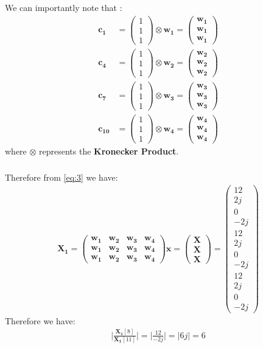 \documentclass{beamer}
\newcommand{\myvec}[1]{\ensuremath{\begin{pmatrix}#1\end{pmatrix}}}
\renewcommand{\vec}[1]{\mathbf{#1}}
\begin{document}
\begin{frame}
\frametitle{}
We can importantly note that :
\begin{align}
\vec{c_{1}} &= \myvec{1 \\ 1 \\ 1} \otimes \vec{w_{1}} = \myvec{\vec{w_{1}} \\ \vec{w_{1}} \\ \vec{w_{1}}}\\
\vec{c_{4}} &= \myvec{1 \\ 1 \\ 1} \otimes \vec{w_{2}} = \myvec{\vec{w_{2}} \\ \vec{w_{2}} \\ \vec{w_{2}}}\\
\vec{c_{7}} &= \myvec{1 \\ 1 \\ 1} \otimes \vec{w_{3}} = \myvec{\vec{w_{3}} \\ \vec{w_{3}} \\ \vec{w_{3}}}\\
\vec{c_{10}} &= \myvec{1 \\ 1 \\ 1} \otimes \vec{w_{4}} = \myvec{\vec{w_{4}} \\ \vec{w_{4}} \\ \vec{w_{4}}}
\end{align}
where $\otimes$ represents the \textbf{Kronecker Product}.
\end{frame}

\begin{frame}
\frametitle{}
Therefore from \eqref{eq:3} we have:
\begin{align}
\vec{X_{1}} = \myvec{\vec{w_{1}} & \vec{w_{2}} & \vec{w_{3}} & \vec{w_{4}} \\ \vec{w_{1}} & \vec{w_{2}} & \vec{w_{3}} & \vec{w_{4}} \\ \vec{w_{1}} & \vec{w_{2}} & \vec{w_{3}} & \vec{w_{4}}}\vec{x}
= \myvec{\vec{X} \\ \vec{X} \\ \vec{X}}
= \myvec{12 \\ 2j \\ 0 \\ -2j \\ 12 \\ 2j \\ 0 \\ -2j \\ 12 \\ 2j \\ 0 \\-2j}
\end{align}
Therefore we have:
\begin{align}
\Big|{\frac{\vec{X_{1}}[8]}{\vec{X_{1}}[11]}}\Big| = \Big|{\frac{12}{-2j}}\Big| =\big|6j\big| = 6
\end{align}  
\end{frame}
\end{document}
